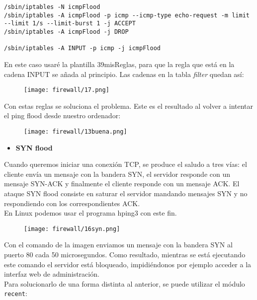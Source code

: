 \begin{lstlisting}
/sbin/iptables -N icmpFlood
/sbin/iptables -A icmpFlood -p icmp --icmp-type echo-request -m limit --limit 1/s --limit-burst 1 -j ACCEPT
/sbin/iptables -A icmpFlood -j DROP

/sbin/iptables -A INPUT -p icmp -j icmpFlood
\end{lstlisting}

En este caso usaré la plantilla 39misReglas, para que la regla que está en la cadena INPUT se añada al principio. Las cadenas en la tabla \textit{filter} quedan así:

\begin{figure}[H]
    \centering
    \texttt{[image: firewall/17.png]}
\end{figure}

Con estas reglas se soluciona el problema. Este es el resultado al volver a intentar el ping flood desde nuestro ordenador:

\begin{figure}[H]
    \centering
    \texttt{[image: firewall/13buena.png]}
\end{figure}
\vspace{0.15cm}
\begin{itemize}
\item \textbf{SYN flood}
\end{itemize}

Cuando queremos iniciar una conexión TCP, se produce el saludo a tres vías: el cliente envía un mensaje con la bandera SYN, el servidor responde con un mensaje SYN-ACK y finalmente el cliente responde con un mensaje ACK. El ataque SYN flood consiste en saturar el servidor mandando mensajes SYN y no respondiendo con los correspondientes ACK.\\

En Linux podemos usar el programa hping3 con este fin.

\begin{figure}[H]
    \centering
    \texttt{[image: firewall/16syn.png]}
\end{figure}

Con el comando de la imagen enviamos un mensaje con la bandera SYN al puerto 80 cada 50 microsegundos. Como resultado, mientras se está ejecutando este comando el servidor está bloqueado, impidiéndonos por ejemplo acceder a la interfaz web de administración.\\

Para solucionarlo de una forma distinta al anterior, se puede utilizar el módulo \lstinline!recent!:

